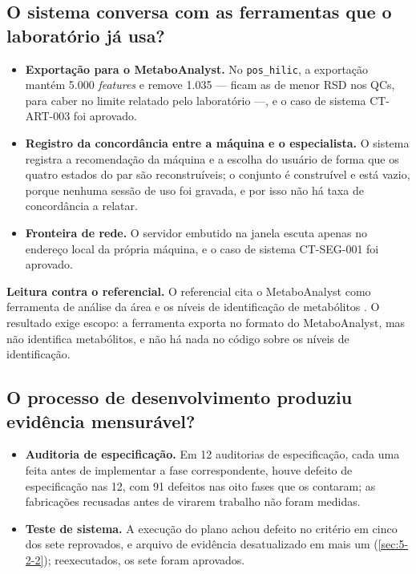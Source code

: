 \subsection{O sistema conversa com as ferramentas que o laboratório já usa?}\label{sec:5-3-5}

\begin{itemize}
\item \textbf{Exportação para o MetaboAnalyst.} No \texttt{pos\_\allowbreak{}hilic}, a exportação mantém 5.000 \textit{features} e remove 1.035 --- ficam as de menor RSD nos QCs, para caber no limite relatado pelo laboratório ---, e o caso de sistema CT-ART-003 foi aprovado.
\item \textbf{Registro da concordância entre a máquina e o especialista.} O sistema registra a recomendação da máquina e a escolha do usuário de forma que os quatro estados do par são reconstruíveis; o conjunto é construível e está vazio, porque nenhuma sessão de uso foi gravada, e por isso não há taxa de concordância a relatar.
\item \textbf{Fronteira de rede.} O servidor embutido na janela escuta apenas no endereço local da própria máquina, e o caso de sistema CT-SEG-001 foi aprovado.
\end{itemize}


\textbf{Leitura contra o referencial.} O referencial cita o MetaboAnalyst como ferramenta de análise da área \cite{pang2024metaboanalyst} e os níveis de identificação de metabólitos \cite{sumner2007proposed}. O resultado exige escopo: a ferramenta exporta no formato do MetaboAnalyst, mas não identifica metabólitos, e não há nada no código sobre os níveis de identificação.

\subsection{O processo de desenvolvimento produziu evidência mensurável?}\label{sec:5-3-6}

\begin{itemize}
\item \textbf{Auditoria de especificação.} Em 12 auditorias de especificação, cada uma feita antes de implementar a fase correspondente, houve defeito de especificação nas 12, com 91 defeitos nas oito fases que os contaram; as fabricações recusadas antes de virarem trabalho não foram medidas.
\item \textbf{Teste de sistema.} A execução do plano achou defeito no critério em cinco dos sete reprovados, e arquivo de evidência desatualizado em mais um (\ref{sec:5-2-2}); reexecutados, os sete foram aprovados.
\end{itemize}

